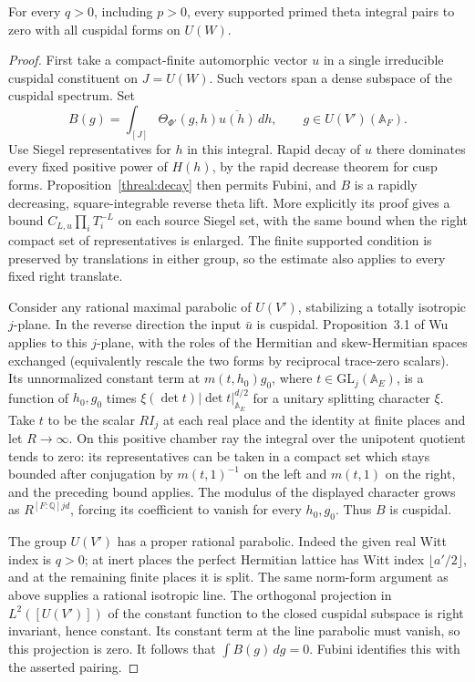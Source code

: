 \begin{proposition}
\label{tpd:orth}
For every \(q>0\), including \(p>0\), every supported primed
theta integral pairs to zero with all cuspidal forms on \(U(W)\).
\end{proposition}
\begin{proof}
First take a compact-finite automorphic vector \(u\) in a single
irreducible cuspidal constituent on \(J=U(W)\). Such vectors span
a dense subspace of the cuspidal spectrum. Set
\[
 B(g)=\int_{[J]}\Theta_{\Phi'}(g,h)\overline{u(h)}\,dh,
        \qquad g\in U(V')(\mathbb A_F).
\]
Use Siegel representatives for \(h\) in this integral. Rapid decay of
\(u\) there dominates every fixed positive power of \(H(h)\), by
the rapid decrease theorem for cusp forms. Proposition~\ref{threal:decay}
then permits Fubini, and \(B\) is a rapidly decreasing, square-integrable
reverse theta lift. More explicitly its proof gives a bound
\(C_{L,u}\prod_i T_i^{-L}\) on each source Siegel set, with the
same bound when the right compact set of representatives is enlarged.
The finite supported condition is preserved by translations in either
group, so the estimate also applies to every fixed right translate.

Consider any rational maximal parabolic of \(U(V')\), stabilizing a
totally isotropic \(j\)-plane. In the reverse direction the input
\(\bar u\) is cuspidal. Proposition~3.1 of Wu applies to this
\(j\)-plane, with the roles of the Hermitian and skew-Hermitian
spaces exchanged (equivalently rescale the two forms by reciprocal
trace-zero scalars). Its unnormalized constant term at
\(m(t,h_0)g_0\), where \(t\in\mathrm{GL}_j(\mathbb A_E)\), is a
function of \(h_0,g_0\) times
\(\xi(\det t)|\det t|_{\mathbb A_E}^{d/2}\) for a unitary
splitting character \(\xi\). Take \(t\) to be the scalar \(R I_j\)
at each real place and the identity at finite places and let
\(R\to\infty\). On this positive chamber ray the integral over the
unipotent quotient tends to zero: its representatives can be taken
in a compact set which stays bounded after conjugation by
\(m(t,1)^{-1}\) on the left and \(m(t,1)\) on the right, and the
preceding bound applies. The modulus of the displayed character
grows as \(R^{[F:\mathbb Q]jd}\), forcing its coefficient to
vanish for every \(h_0,g_0\). Thus \(B\) is cuspidal.
\cite[Proposition~3.1]{wuThetaTower}

The group \(U(V')\) has a proper rational parabolic. Indeed the
given real Witt index is \(q>0\); at inert places the perfect
Hermitian lattice has Witt index \(\lfloor a'/2\rfloor\), and at
the remaining finite places it is split. The same norm-form
argument as above supplies a rational isotropic line.
The orthogonal projection in \(L^2([U(V')])\) of the constant
function to the closed cuspidal subspace is right invariant, hence
constant. Its constant term at the line parabolic must vanish, so
this projection is zero. It follows that \(\int B(g)\,dg=0\).
Fubini identifies this with the asserted pairing.
\end{proof}

